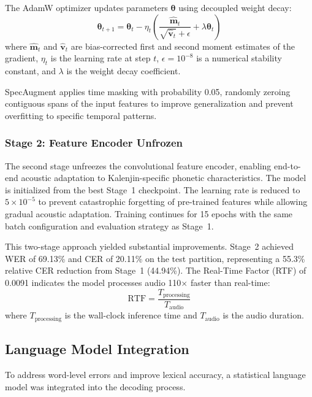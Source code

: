 \documentclass[conference]{IEEEtran}
\begin{document}
The AdamW optimizer \cite{b23} updates parameters $\boldsymbol{\theta}$ using decoupled weight decay:
\begin{equation}
\boldsymbol{\theta}_{t+1} = \boldsymbol{\theta}_t - \eta_t \left(\frac{\hat{\mathbf{m}}_t}{\sqrt{\hat{\mathbf{v}}_t} + \epsilon} + \lambda \boldsymbol{\theta}_t\right)
\label{eq:adamw}
\end{equation}
where $\hat{\mathbf{m}}_t$ and $\hat{\mathbf{v}}_t$ are bias-corrected first and second moment estimates of the gradient, $\eta_t$ is the learning rate at step $t$, $\epsilon = 10^{-8}$ is a numerical stability constant, and $\lambda$ is the weight decay coefficient.

SpecAugment \cite{b19} applies time masking with probability 0.05, randomly zeroing contiguous spans of the input features to improve generalization and prevent overfitting to specific temporal patterns.

\subsubsection{Stage 2: Feature Encoder Unfrozen}
The second stage unfreezes the convolutional feature encoder, enabling end-to-end acoustic adaptation to Kalenjin-specific phonetic characteristics. The model is initialized from the best Stage~1 checkpoint. The learning rate is reduced to $5 \times 10^{-5}$ to prevent catastrophic forgetting of pre-trained features while allowing gradual acoustic adaptation. Training continues for 15 epochs with the same batch configuration and evaluation strategy as Stage~1.

This two-stage approach yielded substantial improvements. Stage~2 achieved WER of 69.13\% and CER of 20.11\% on the test partition, representing a 55.3\% relative CER reduction from Stage~1 (44.94\%). The Real-Time Factor (RTF) of 0.0091 indicates the model processes audio 110$\times$ faster than real-time:
\begin{equation}
\text{RTF} = \frac{T_{\text{processing}}}{T_{\text{audio}}}
\label{eq:rtf}
\end{equation}
where $T_{\text{processing}}$ is the wall-clock inference time and $T_{\text{audio}}$ is the audio duration.

\subsection{Language Model Integration}

To address word-level errors and improve lexical accuracy, a statistical language model was integrated into the decoding process.
\end{document}
